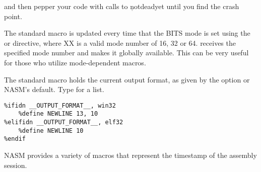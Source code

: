 and then pepper your code with calls to \c{notdeadyet} until you
find the crash point.


The  standard macro is updated every time that the BITS
mode is set using the  or \code{[BITS XX]} directive,
where XX is a valid mode number of 16, 32 or 64.  receives
the specified mode number and makes it globally available. This can be very
useful for those who utilize mode-dependent macros.


The  standard macro holds the current output format,
as given by the  option or NASM's default. Type  for a
list.

\begin{lstlisting}
%ifidn __OUTPUT_FORMAT__, win32
    %define NEWLINE 13, 10
%elifidn __OUTPUT_FORMAT__, elf32
    %define NEWLINE 10
%endif
\end{lstlisting}


NASM provides a variety of macros that represent the timestamp of the
assembly session.

